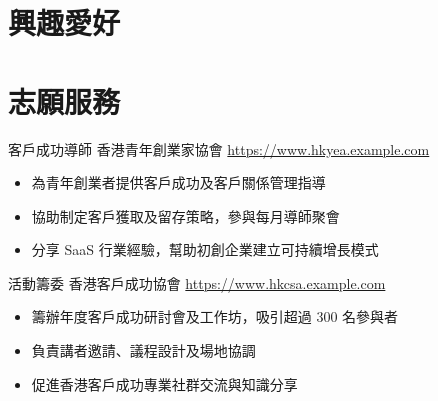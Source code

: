 \documentclass[a4paper, serif, 10pt]{moderncv}
\begin{document}
\section{興趣愛好}

\section{志願服務}

        {客戶成功導師}
        {香港青年創業家協會}
        {\url{https://www.hkyea.example.com}}
        {}
        {\begin{itemize}
\item 為青年創業者提供客戶成功及客戶關係管理指導
\item 協助制定客戶獲取及留存策略，參與每月導師聚會
\item 分享 SaaS 行業經驗，幫助初創企業建立可持續增長模式
\end{itemize}}
    

        {活動籌委}
        {香港客戶成功協會}
        {\url{https://www.hkcsa.example.com}}
        {}
        {\begin{itemize}
\item 籌辦年度客戶成功研討會及工作坊，吸引超過 300 名參與者
\item 負責講者邀請、議程設計及場地協調
\item 促進香港客戶成功專業社群交流與知識分享
\end{itemize}}
    
\end{document}

